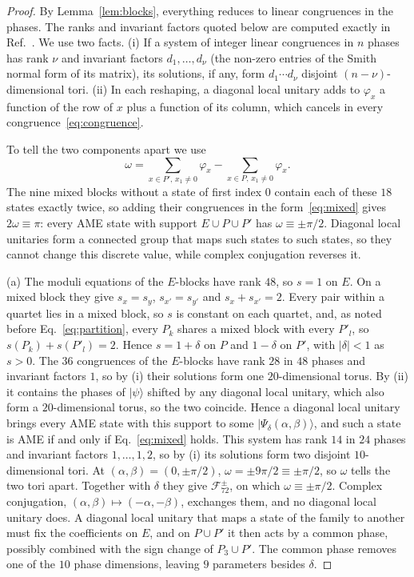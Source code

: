 \documentclass[aps,pra,reprint,superscriptaddress,amsmath,amssymb,longbibliography]{revtex4-2}
\newcommand{\ket}[1]{\lvert #1\rangle}
\theoremstyle{plain}
\begin{document}
\begin{proof}
By Lemma~\ref{lem:blocks}, everything reduces to linear congruences in the phases.  The ranks and invariant factors
quoted below are computed exactly in Ref.~\cite{repo}.  We use two facts.  (i) If a system of integer linear
congruences in $n$ phases has rank $\nu$ and invariant factors $d_1,\dots,d_\nu$ (the non-zero entries of the Smith
normal form of its matrix), its solutions, if any, form $d_1\cdots d_\nu$ disjoint $(n-\nu)$-dimensional tori.
(ii) In each reshaping, a diagonal local unitary adds to $\varphi_x$ a function of the row of $x$ plus a function of
its column, which cancels in every congruence~\eqref{eq:congruence}.

To tell the two components apart we use
\[
\omega=\sum_{x\in P',\,x_1\neq0}\varphi_x-\sum_{x\in P,\,x_1\neq0}\varphi_x .
\]
The nine mixed blocks without a state of first index $0$ contain each of these $18$ states exactly twice, so adding
their congruences in the form~\eqref{eq:mixed} gives $2\omega\equiv\pi$: every AME state with support $E\cup P\cup P'$
has $\omega\equiv\pm\pi/2$.  Diagonal local unitaries form a connected group that maps such states to such states, so
they cannot change this discrete value, while complex conjugation reverses it.

(a) The moduli equations of the $E$-blocks have rank $48$, so $s=1$ on $E$.  On a mixed block they give $s_x=s_y$,
$s_{x'}=s_{y'}$ and $s_x+s_{x'}=2$.  Every pair within a quartet lies in a mixed block, so $s$ is constant on each
quartet, and, as noted before Eq.~\eqref{eq:partition}, every $P_k$ shares a mixed block with every $P'_l$, so $s(P_k)+s(P'_l)=2$.
Hence $s=1+\delta$ on $P$ and $1-\delta$ on $P'$, with $|\delta|<1$ as $s>0$.  The $36$ congruences of the
$E$-blocks have rank $28$ in $48$ phases and invariant factors $1$, so by (i) their solutions form one $20$-dimensional
torus.  By (ii) it contains the phases of $\ket\psi$ shifted by any diagonal local unitary, which also form a
$20$-dimensional torus, so the two coincide.  Hence a diagonal local unitary brings every AME state with this support to some
$\ket{\Psi_\delta(\alpha,\beta)}$, and such a state is AME if and only if Eq.~\eqref{eq:mixed} holds.  This system has
rank $14$ in $24$ phases and invariant factors $1,\dots,1,2$, so by (i) its solutions form two disjoint
$10$-dimensional tori.  At $(\alpha,\beta)=(0,\pm\pi/2)$, $\omega=\pm9\pi/2\equiv\pm\pi/2$, so $\omega$ tells the two
tori apart.  Together with $\delta$ they give $\mathcal F_{72}^\pm$, on which $\omega\equiv\pm\pi/2$.  Complex
conjugation, $(\alpha,\beta)\mapsto(-\alpha,-\beta)$, exchanges them, and no diagonal local unitary does.  A diagonal
local unitary that maps a state of the family to another must fix the coefficients on $E$, and on $P\cup P'$ it then acts
by a common phase, possibly combined with the sign change of $P_3\cup P'$.  The common phase removes one of the $10$
phase dimensions, leaving $9$ parameters besides $\delta$.


\end{proof}
\end{document}
